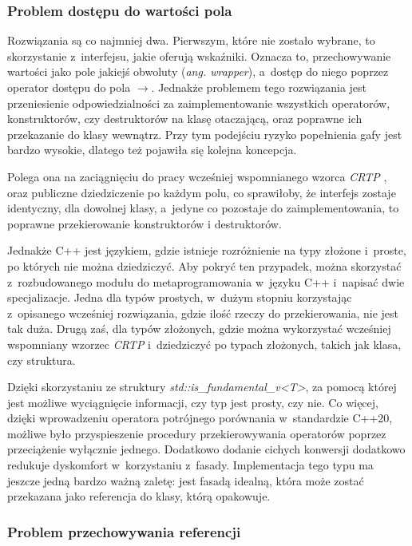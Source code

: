\documentclass[12pt]{article}
\newcommand{\n}{\newline}
\newcommand{\nonpl}[1]{{\it #1}}
\newcommand{\code}[1]{{\it #1}}
\newcommand{\ang}[1]{\nonpl{ang. #1}}
\newcommand{\CRTP}{\nonpl{CRTP} }
\begin{document}
{{			{
				\subsubsection{Problem dostępu do wartości pola}

				Rozwiązania są co najmniej dwa. Pierwszym, które nie zostało wybrane, to skorzystanie z~interfejsu, jakie oferują wskaźniki. Oznacza to,
				przechowywanie wartości jako pole jakiejś obwoluty (\ang{wrapper}), a~dostęp do niego poprzez operator dostępu do pola $\rightarrow$. Jednakże problemem
				tego rozwiązania jest przeniesienie odpowiedzialności za zaimplementowanie wszystkich operatorów, konstruktorów, czy destruktorów
				na klasę otaczającą, oraz poprawne ich przekazanie do klasy wewnątrz. Przy tym podejściu ryzyko popełnienia gafy jest bardzo wysokie, dlatego też
				pojawiła się kolejna koncepcja.\n

				Polega ona na zaciągnięciu do pracy wcześniej wspomnianego wzorca \CRTP, oraz publiczne dziedziczenie po każdym polu, co sprawiłoby, że
				interfejs zostaje identyczny, dla dowolnej klasy, a~jedyne co pozostaje do zaimplementowania, to poprawne przekierowanie konstruktorów
				i destruktorów.\n

				Jednakże C++ jest językiem, gdzie istnieje rozróżnienie na typy złożone i~proste, po których nie można dziedziczyć. Aby pokryć ten przypadek,
				można skorzystać z~rozbudowanego modułu do metaprogramowania w~języku C++ i~napisać dwie specjalizacje. Jedna dla typów prostych, w~dużym stopniu
				korzystając z~opisanego wcześniej rozwiązania, gdzie ilość rzeczy do przekierowania, nie jest tak duża. Drugą zaś, dla typów złożonych,
				gdzie można wykorzystać wcześniej wspomniany wzorzec \CRTP i~dziedziczyć po typach złożonych, takich jak klasa, czy struktura.\n

				Dzięki skorzystaniu ze struktury \code{std::is\_fundamental\_v<T>}\cite{std_is_fundamental}, za pomocą której jest możliwe wyciągnięcie informacji,
				czy typ jest prosty, czy nie. Co więcej, dzięki wprowadzeniu operatora potrójnego porównania \cite{starship_operator} w~standardzie C++20, możliwe było
				przyspieszenie procedury przekierowywania operatorów poprzez przeciążenie wyłącznie jednego. Dodatkowo dodanie cichych konwersji dodatkowo redukuje
				dyskomfort w~korzystaniu z~fasady. Implementacja tego typu ma jeszcze jedną bardzo ważną zaletę: jest fasadą idealną, która może zostać przekazana jako referencja
				do klasy, którą opakowuje.
			}

			{
				\subsubsection{Problem przechowywania referencji}

}}}
\end{document}
